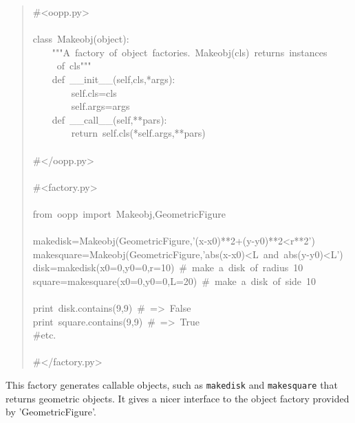 \documentclass[10pt,english]{article}
\begin{document}
\begin{quote}
\begin{ttfamily}\begin{flushleft}
\mbox{{\#}<oopp.py>}\\
\mbox{}\\
\mbox{class~Makeobj(object):}\\
\mbox{~~~~"""A~factory~of~object~factories.~Makeobj(cls)~returns~instances}\\
\mbox{~~~~~of~cls"""}\\
\mbox{~~~~def~{\_}{\_}init{\_}{\_}(self,cls,*args):}\\
\mbox{~~~~~~~~self.cls=cls}\\
\mbox{~~~~~~~~self.args=args}\\
\mbox{~~~~def~{\_}{\_}call{\_}{\_}(self,**pars):}\\
\mbox{~~~~~~~~return~self.cls(*self.args,**pars)}\\
\mbox{}\\
\mbox{{\#}</oopp.py>}\\
\mbox{}\\
\mbox{{\#}<factory.py>}\\
\mbox{}\\
\mbox{from~oopp~import~Makeobj,GeometricFigure}\\
\mbox{}\\
\mbox{makedisk=Makeobj(GeometricFigure,'(x-x0)**2+(y-y0)**2<r**2')}\\
\mbox{makesquare=Makeobj(GeometricFigure,'abs(x-x0)<L~and~abs(y-y0)<L')}\\
\mbox{disk=makedisk(x0=0,y0=0,r=10)~{\#}~make~a~disk~of~radius~10}\\
\mbox{square=makesquare(x0=0,y0=0,L=20)~{\#}~make~a~disk~of~side~10}\\
\mbox{}\\
\mbox{print~disk.contains(9,9)~{\#}~=>~False}\\
\mbox{print~square.contains(9,9)~{\#}~=>~True}\\
\mbox{{\#}etc.}\\
\mbox{}\\
\mbox{{\#}</factory.py>}
\end{flushleft}\end{ttfamily}
\end{quote}

This factory generates callable objects, such as \texttt{makedisk} and
\texttt{makesquare} that returns geometric objects. It gives a nicer interface
to the object factory provided by 'GeometricFigure'.
\end{document}
